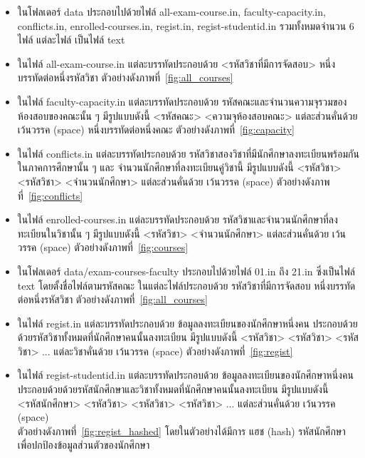 \begin{itemize}
  \item ในโฟลเดอร์ data ประกอบไปด้วยไฟล์ all-exam-course.in, faculty-capacity.in, conflicts.in,
  enrolled-courses.in, regist.in, regist-studentid.in รวมทั้งหมดจำนวน 6 ไฟล์ แต่ละไฟล์ เป็นไฟล์ text 
  \item ในไฟล์ all-exam-course.in แต่ละบรรทัดประกอบด้วย <รหัสวิชาที่มีการจัดสอบ> หนึ่งบรรทัดต่อหนึ่งรหัสวิชา ตัวอย่างดังภาพที่~\ref{fig:all_courses}
  \item ในไฟล์ faculty-capacity.in แต่ละบรรทัดประกอบด้วย รหัสคณะและจำนวนความจุรวมของห้องสอบของคณะนั้น ๆ มีรูปแบบดังนี้ <รหัสคณะ> <ความจุห้องสอบคณะ> แต่ละส่วนคั่นด้วย เว้นวรรค (space) หนึ่งบรรทัดต่อหนึ่งคณะ ตัวอย่างดังภาพที่~\ref{fig:capacity}
  \item ในไฟล์ conflicts.in แต่ละบรรทัดประกอบด้วย รหัสวิชาสองวิชาที่มีนักศึกษาลงทะเบียนพร้อมกันในภาคการศึกษานั้น ๆ และ จำนวนนักศึกษาที่ลงทะเบียนคู่วิชานี้ มีรูปแบบดังนี้ <รหัสวิชา> <รหัสวิชา> <จำนวนนักศึกษา> แต่ละส่วนคั่นด้วย เว้นวรรค (space) ตัวอย่างดังภาพที่~\ref{fig:conflicts}
  \item ในไฟล์ enrolled-courses.in แต่ละบรรทัดประกอบด้วย รหัสวิชาและจำนวนนักศึกษาที่ลงทะเบียนในวิชานั้น ๆ มีรูปแบบดังนี้ <รหัสวิชา> <จำนวนนักศึกษา> แต่ละส่วนคั่นด้วย เว้นวรรค (space) ตัวอย่างดังภาพที่~\ref{fig:courses}
  \item ในโฟลเดอร์ data/exam-courses-faculty ประกอบไปด้วยไฟล์ 01.in ถึง 21.in ซึ่งเป็นไฟล์ text โดยตั้งชื่อไฟล์ตามรหัสคณะ ในแต่ละไฟล์ประกอบด้วย รหัสวิชาที่มีการจัดสอบ หนึ่งบรรทัดต่อหนึ่งรหัสวิชา ตัวอย่างดังภาพที่~\ref{fig:all_courses} 
  \item ในไฟล์ regist.in แต่ละบรรทัดประกอบด้วย ข้อมูลลงทะเบียนของนักศึกษาหนึ่งคน ประกอบด้วยด้วยรหัสวิชาทั้งหมดที่นักศึกษาคนนั้นลงทะเบียน มีรูปแบบดังนี้ <รหัสวิชา> <รหัสวิชา> <รหัสวิชา> ... แต่ละวิชาคั่นด้วย เว้นวรรค (space) ตัวอย่างดังภาพที่~\ref{fig:regist}
  \item ในไฟล์ regist-studentid.in แต่ละบรรทัดประกอบด้วย ข้อมูลลงทะเบียนของนักศึกษาหนึ่งคน \\ ประกอบด้วยด้วยรหัสนักศึกษาและวิชาทั้งหมดที่นักศึกษาคนนั้นลงทะเบียน มีรูปแบบดังนี้ \\ <รหัสนักศึกษา> <รหัสวิชา> <รหัสวิชา> <รหัสวิชา> ... แต่ละส่วนคั่นด้วย เว้นวรรค (space) \\ ตัวอย่างดังภาพที่~\ref{fig:regist_hashed}
  โดยในตัวอย่างได้มีการ แฮช (hash) รหัสนักศึกษา เพื่อปกป้องข้อมูลส่วนตัวของนักศึกษา
\end{itemize}


